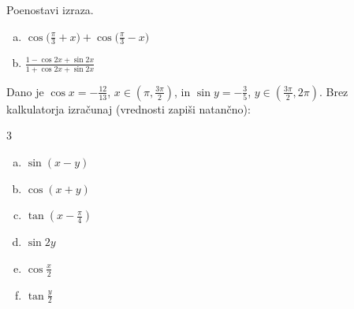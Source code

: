 \documentclass[a4paper,12pt]{letter}
\newcommand{\ds}{\displaystyle}
\newcounter{tocke}
\begin{document}
 \newpage
\begin{naloga}[\hfill $\tockeD$] \addtocounter{tocke}{\numexpr\tockeD\relax}
Poenostavi izraza.
\begin{enumerate}[a)]
\item $\ds\cos\Big(\frac{\pi}{3}+x\Big)+\cos\Big(\frac{\pi}{3}-x\Big)$
\item $\ds\frac{1-\cos2x+\sin2x}{1+\cos2x+\sin2x}$
\end{enumerate}
\end{naloga}\newpage

\begin{naloga}[\hfill $\tockeE$] \addtocounter{tocke}{\numexpr\tockeE\relax}
Dano je $\cos x=-\frac{12}{13}$, $x\in\left(\pi,\frac{3\pi}{2}\right)$, in $\sin y=-\frac{3}{5}$, $y\in\left(\frac{3\pi}{2},2\pi\right)$. Brez kalkulatorja izra\v{c}unaj (vrednosti zapi\v{s}i natan\v{c}no):
\begin{multicols}{3}
\begin{enumerate}[a)]
\item $\ds\sin(x-y)$
\item $\ds\cos(x+y)$
\item $\ds\tan\left(x-\frac{\pi}{4}\right)$
\item $\ds\sin2y$
\item $\ds\cos\frac{x}{2}$
\item $\ds\tan\frac{y}{2}$
\end{enumerate}
\end{multicols}
\end{naloga}\newpage
\end{document}
